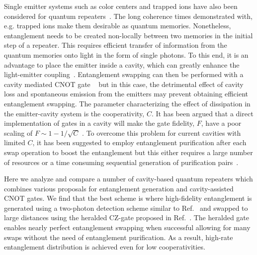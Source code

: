 Single emitter systems such as color centers and trapped ions have also been
considered for quantum repeaters~\cite{childress,sangouard2}. The long coherence
times demonstrated with, e.g. trapped ions make them desirable as quantum
memories. Nonetheless, entanglement needs to be created non-locally between two
memories in the initial step of a repeater. This requires efficient transfer of
information from the quantum memories onto light in the form of single photons.
To this end, it is an advantage to place the emitter inside a cavity, which can
greatly enhance the light-emitter coupling~\cite{acin,ritter}. Entanglement
swapping can then be performed with a cavity mediated CNOT gate
~\cite{pellizari,haroche1} but in this case, the detrimental effect of cavity loss
and spontaneous emission from the emitters may prevent obtaining efficient
entanglement swapping. The parameter characterizing the effect of dissipation in
the emitter-cavity system is the cooperativity, $C$. It has been argued that a
direct implementation of gates in a cavity will make the gate fidelity, $F$,
have a poor scaling of $F\sim1-1/\sqrt{C}$ \cite{kastoryano,Anders2prl}. To
overcome this problem for current cavities with limited $C$, it has been
suggested to employ entanglement purification after each swap operation to boost
the entanglement but this either requires a large number of resources or a time
consuming sequential generation of purification
pairs~\cite{bennett,deutsch,duan4,pan}.

Here we analyze and compare a number of cavity-based quantum repeaters which
combines various proposals for entanglement generation and cavity-assisted CNOT
gates. We find that the best scheme is where high-fidelity entanglement is
generated using a two-photon detection scheme similar to Ref.~\cite{kimble2} and
swapped to large distances using the heralded CZ-gate proposed in
Ref.~\cite{Borregaard2015a}. The heralded gate enables nearly perfect entanglement
swapping when successful allowing for many swaps without the need of
entanglement purification. As a result, high-rate entanglement distribution is
achieved even for low cooperativities.


